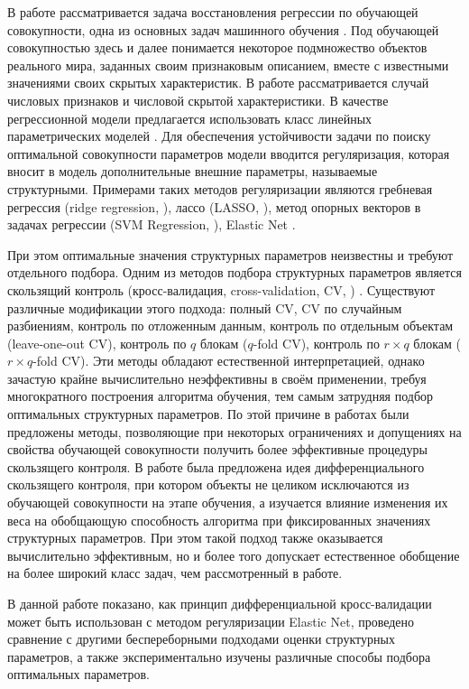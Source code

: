 В работе рассматривается задача восстановления регрессии по обучающей совокупности, одна из основных задач машинного обучения \cite{vap99}. 
Под обучающей совокупностью здесь и далее понимается некоторое подмножество объектов реального мира, заданных своим признаковым описанием, вместе с известными значениями своих скрытых характеристик. 
В работе рассматривается случай числовых признаков и числовой скрытой характеристики.
В качестве регрессионной модели предлагается использовать класс линейных параметрических моделей \cite{ivch09}. 
Для обеспечения устойчивости задачи по поиску оптимальной совокупности параметров модели вводится регуляризация, которая вносит в модель дополнительные внешние параметры, называемые структурными.
Примерами таких методов регуляризации являются гребневая регрессия (ridge regression, \cite{hoerl70}), лассо (LASSO, \cite{tib96}), метод опорных векторов в задачах регрессии (SVM Regression, \cite{dru96}), Elastic Net \cite{zou05}.

При этом оптимальные значения структурных параметров неизвестны и требуют отдельного подбора. 
Одним из методов подбора структурных параметров является скользящий контроль (кросс-валидация, cross-validation, CV, \cite{voron}) .
Существуют различные модификации этого подхода: полный CV, CV по случайным разбиениям, контроль по отложенным данным, контроль по отдельным объектам (leave-one-out CV), контроль по $q$ блокам ($q$-fold CV), контроль по $r\times q$ блокам ($r\times q$-fold CV). 
Эти методы обладают естественной интерпретацией, однако зачастую крайне вычислительно неэффективны в своём применении, требуя многократного построения алгоритма обучения, тем самым затрудняя подбор оптимальных структурных параметров. 
По этой причине в работах \cite{cawley,che14} были предложены методы, позволяющие при некоторых ограничениях и допущениях на свойства обучающей совокупности получить более эффективные процедуры скользящего контроля.
В работе \cite{gre12} была предложена идея дифференциального скользящего контроля, при котором объекты не целиком исключаются из обучающей совокупности на этапе обучения, 
а изучается влияние изменения их веса на обобщающую способность алгоритма при фиксированных значениях структурных параметров. 
При этом такой подход также оказывается вычислительно эффективным, но и более того допускает естественное обобщение на более широкий класс задач, чем рассмотренный в работе.

В данной работе показано, как принцип дифференциальной кросс-валидации может быть использован с методом регуляризации Elastic Net, проведено сравнение с другими беспереборными подходами оценки структурных параметров, а также экспериментально изучены различные способы подбора оптимальных параметров.